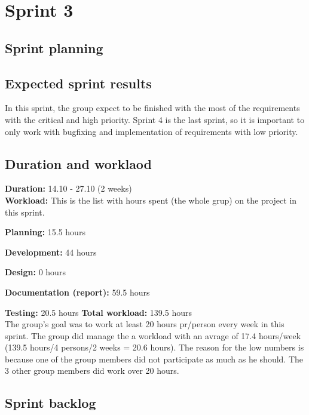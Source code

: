 \section{Sprint 3}

\subsection{Sprint planning}

\subsection{Expected sprint results}
	In this sprint, the group expect to be finished with the most of the requirements 
	with the critical and high priority. Sprint 4 is the last sprint, so it is important
	to only work with bugfixing and implementation of requirements with low priority.


\subsection{Duration and worklaod}

	{\bf Duration:} 14.10 - 27.10 (2 weeks)\\
	{\bf Workload:} This is the list with hours spent (the whole grup) on the project in this sprint.
		\item {\bf Planning:} 15.5 hours
		\item {\bf Development:} 44 hours
		\item {\bf Design:} 0 hours
		\item {\bf Documentation (report):} 59.5 hours
		\item {\bf Testing:} 20.5 hours 
	{\bf Total workload: } 139.5 hours \\

	The group's goal was to work at least 20 hours pr/person every week in this sprint. 
	The group did manage the a workload with an avrage of 17.4 hours/week (139.5 hours/4 persons/2 weeks = 20.6 hours). The reason for the low numbers is because one of the group members did not
	participate as much as he should. The 3 other group members did work over 20 hours. 


\clearpage
\subsection{Sprint backlog}

